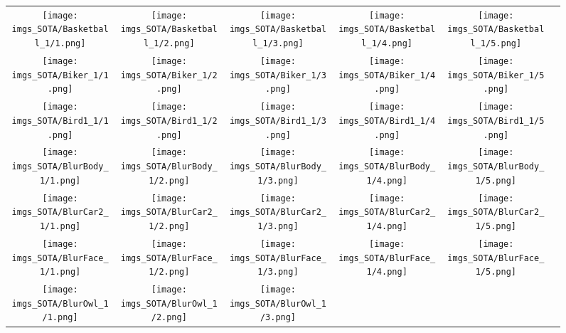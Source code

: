 \begin{figure}[H]
\setlength{\tabcolsep}{6pt}
\renewcommand{\arraystretch}{0}
\begin{tabular}{@{}c@{}c@{}c@{}c@{}c@{}c@{}}\texttt{[image: imgs\_SOTA/Basketball\_1/1.png]}&
\texttt{[image: imgs\_SOTA/Basketball\_1/2.png]}&
\texttt{[image: imgs\_SOTA/Basketball\_1/3.png]}&
\texttt{[image: imgs\_SOTA/Basketball\_1/4.png]}&
\texttt{[image: imgs\_SOTA/Basketball\_1/5.png]}&
\\
\texttt{[image: imgs\_SOTA/Biker\_1/1.png]}&
\texttt{[image: imgs\_SOTA/Biker\_1/2.png]}&
\texttt{[image: imgs\_SOTA/Biker\_1/3.png]}&
\texttt{[image: imgs\_SOTA/Biker\_1/4.png]}&
\texttt{[image: imgs\_SOTA/Biker\_1/5.png]}&
\\
\texttt{[image: imgs\_SOTA/Bird1\_1/1.png]}&
\texttt{[image: imgs\_SOTA/Bird1\_1/2.png]}&
\texttt{[image: imgs\_SOTA/Bird1\_1/3.png]}&
\texttt{[image: imgs\_SOTA/Bird1\_1/4.png]}&
\texttt{[image: imgs\_SOTA/Bird1\_1/5.png]}&
\\
\texttt{[image: imgs\_SOTA/BlurBody\_1/1.png]}&
\texttt{[image: imgs\_SOTA/BlurBody\_1/2.png]}&
\texttt{[image: imgs\_SOTA/BlurBody\_1/3.png]}&
\texttt{[image: imgs\_SOTA/BlurBody\_1/4.png]}&
\texttt{[image: imgs\_SOTA/BlurBody\_1/5.png]}&
\\
\texttt{[image: imgs\_SOTA/BlurCar2\_1/1.png]}&
\texttt{[image: imgs\_SOTA/BlurCar2\_1/2.png]}&
\texttt{[image: imgs\_SOTA/BlurCar2\_1/3.png]}&
\texttt{[image: imgs\_SOTA/BlurCar2\_1/4.png]}&
\texttt{[image: imgs\_SOTA/BlurCar2\_1/5.png]}&
\\
\texttt{[image: imgs\_SOTA/BlurFace\_1/1.png]}&
\texttt{[image: imgs\_SOTA/BlurFace\_1/2.png]}&
\texttt{[image: imgs\_SOTA/BlurFace\_1/3.png]}&
\texttt{[image: imgs\_SOTA/BlurFace\_1/4.png]}&
\texttt{[image: imgs\_SOTA/BlurFace\_1/5.png]}&
\\
\texttt{[image: imgs\_SOTA/BlurOwl\_1/1.png]}&
\texttt{[image: imgs\_SOTA/BlurOwl\_1/2.png]}&
\texttt{[image: imgs\_SOTA/BlurOwl\_1/3.png]}&

\end{tabular}
\end{figure}
